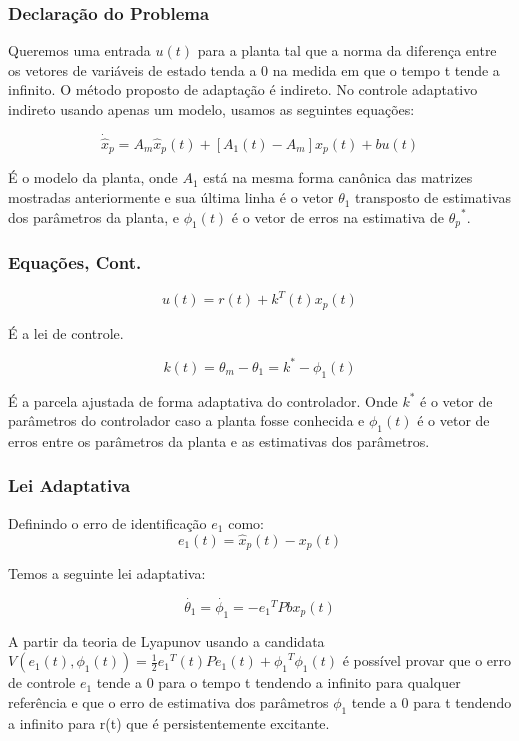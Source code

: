\documentclass[aspectratio=169]{beamer}
\begin{document}
\begin{frame}
\frametitle{Declaração do Problema}

Queremos uma entrada $u(t)$ para a planta tal que a norma da diferença entre os vetores de variáveis de estado tenda a 0 na medida em que o tempo t tende a infinito. O método proposto de adaptação é indireto. No controle adaptativo indireto usando apenas um modelo, usamos as seguintes equações:

\begin{equation}
\dot{\hat{x}}_p = A_m\hat{x}_p(t) + [A_1(t)-A_m]x_p(t) +bu(t)
\end{equation}

É o modelo da planta, onde $A_1$ está na mesma forma canônica das matrizes mostradas anteriormente e sua última linha é o vetor $\theta_1$ transposto de estimativas dos parâmetros da planta, e $\phi_1(t)$ é o vetor de erros na estimativa de ${\theta_p}^*$.

\end{frame}

\begin{frame}
\frametitle{Equações, Cont.}

\begin{equation}
u(t) = r(t) +k^T(t)x_p(t)
\end{equation}

É a lei de controle.

\begin{equation}
k(t) = \theta_m - \theta_1 = k^* - \phi_1(t)
\end{equation}

É a parcela ajustada de forma adaptativa do controlador. Onde $k^*$ é o vetor de parâmetros do controlador caso a planta fosse conhecida e $\phi_1(t)$ é o vetor de erros entre os parâmetros da planta e as estimativas dos parâmetros.

\end{frame}
\begin{frame}
\frametitle{Lei Adaptativa}

Definindo o erro de identificação $e_1$ como:
\begin{equation}
e_1(t) = \hat{x}_p(t) - x_p(t)
\end{equation}

Temos a seguinte lei adaptativa:

\begin{equation}
\dot{\theta_1} = \dot{\phi_1} = -{e_1}^TPbx_p(t)
\end{equation}

A partir da teoria de Lyapunov usando a candidata $V(e_1(t), \phi_1(t))= \frac{1}{2} {e_1}^T(t)Pe_1(t) + {\phi_1}^T\phi_1(t)$ é possível provar que o erro de controle $e_1$ tende a 0 para o tempo t tendendo a infinito para qualquer referência e que o erro de estimativa dos parâmetros $\phi_1$ tende a 0 para t tendendo a infinito para r(t) que é persistentemente excitante.


\end{frame}
\end{document}
